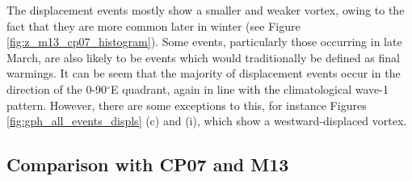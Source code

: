 The displacement events mostly show a smaller and weaker vortex, owing to the
fact that they are more common later in winter (see Figure
\ref{fig:z_m13_cp07_histogram}). Some events, particularly those occurring in
late March, are also likely to be events which would traditionally be defined as
final warmings. It can be seem that the majority of displacement events occur in
the direction of the 0-90$^{\circ}$E quadrant, again in line with the
climatological wave-1 pattern. However, there are some exceptions to this, for
instance Figures \ref{fig:gph_all_events_displs} (c) and (i), which  show a
westward-displaced vortex. 



\subsection{Comparison with CP07 and M13}

